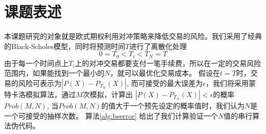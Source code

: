 
\section{课题表述} %
\label{sec:subject}

本课题研究的对象就是欧式期权利用对冲策略来降低交易的风险。我们采用了经典的Black-Scholes模型，同时将预测时间$T$进行了离散化处理
\begin{equation}
   0=T_0 < T_i < T_N = T
\end{equation}
由于每一个时间点上$T_i$上的对冲交易都要支付一笔手续费，所以在一定的交易风险范围内，如果能找到一个最小的$N$，就可以最优化交易成本。
假设在$t=T$时，交易的风险可表示为$|P(X) - P_{T_N}(X)|$, 而可接受的最大误差为$\epsilon$，我们将采用蒙特卡洛模拟算法，通过$M$次模拟，计算出
$|P(X) - P_{T_N}(X)| < \epsilon$的概率$Prob(M,N)$, 当$Prob(M,N)$的值大于一个预先设定的概率值时，我们认为$N$是一个可接受的抽样次数。
算法\ref{alg:bserror} 给出了我们计算验证一个$N$值的串行算法伪代码。

